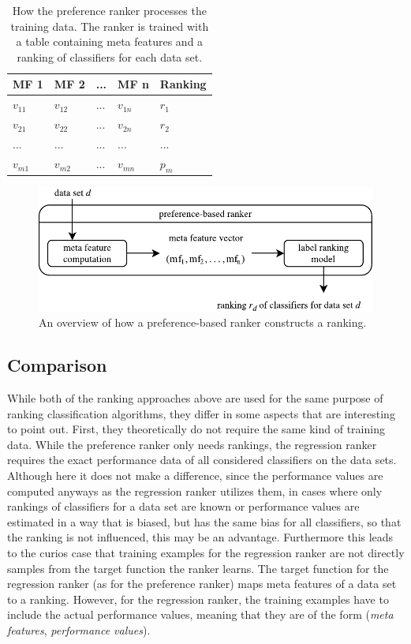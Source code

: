 \begin{table}[h]
\centering
	\begin{tabularx}{\textwidth}{X | X | X | X | X}
		MF 1				& MF 2				& ... 	& MF n				& Ranking 	\\ \hline
		$v_{11}$			& $v_{12}$			& ...	& $v_{1n}$			& $r_1$		\\ 
		$v_{21}$			& $v_{22}$			& ...	& $v_{2n}$			& $r_2$		\\
		...				& ...				& ...	& ...				& ...		\\
		$v_{m1}$			& $v_{m2}$			& ... 	& $v_{mn}$			& $p_m$		 
	\end{tabularx}
	\label{tab:preferenceTable}
	\caption{How the preference ranker processes the training data. The ranker is trained with a table containing meta features and a ranking of classifiers for each data set.}
\end{table}

\begin{figure}
\centering
\includegraphics[scale=1]{gfx/label_ranking_model.pdf}
\caption{An overview of how a preference-based ranker constructs a ranking.}
\label{fig:preference_ranker_model}
\end{figure}

\subsection{Comparison}

While both of the ranking approaches above are used for the same purpose of ranking classification algorithms, they differ in some aspects that are interesting to point out. First, they theoretically do not require the same kind of training data. While the preference ranker only needs rankings, the regression ranker requires the exact performance data of all considered classifiers on the data sets. Although here it does not make a difference, since the performance values are computed anyways as the regression ranker utilizes them, in cases where only rankings of classifiers for a data set are known or performance values are estimated in a way that is biased, but has the same bias for all classifiers, so that the ranking is not influenced, this may be an advantage. Furthermore this leads to the curios case that training examples for the regression ranker are not directly samples from the target function the ranker learns. The target function for the regression ranker (as for the preference ranker) maps meta features of a data set to a ranking. However, for the regression ranker, the training examples have to include the actual performance values, meaning that they are of the form (\textit{meta features}, \textit{performance values}). 

